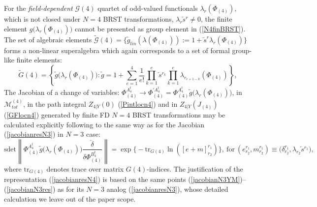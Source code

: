 \documentclass[10pt]{article}
\begin{document}
For the \emph{field-dependent}  $\mathcal{G}(4)$ quartet of odd-valued functionals $\lambda_r({\Phi}_{(4)})$,
which is not closed under $N=4$ BRST transformations, $\lambda_r \overleftarrow{s}{}^r \ne 0$,  the  finite element $g\big(\lambda_r({\Phi}_{(4)})\big)$ cannot be presented as group element  in (\ref{N4finBRST}). The set of algebraic elements
$\widetilde{\mathcal{G}}(4) =\big\{\tilde{g}_{lin}(\lambda ({\Phi}_{(4)})):=1+\overleftarrow{s}^r\lambda_r({\Phi}_{(4)})\big\}$
forms a non-linear superalgebra which again corresponds to a set of formal group-like finite elements:
\begin{equation}
\tilde{G}(4)=\left\{ \tilde{g}\big(\lambda_r({\Phi}_{(4)})\big):\tilde{g}=1+  \sum_{e=1}^4\frac{1}{e!}\prod_{k=1}^e  \overleftarrow{s}{}^{r_k} \prod_{k=1}^e \lambda_{r_{e+1-k}}({\Phi}_{(4)}) \right\} ,
\label{tildeG4}
\end{equation}
The Jacobian of a change of variables:
${\Phi}{}^{A^t_4}_{(4)}\to {\Phi}{}^{\prime A^t_4}_{(4)}=
{\Phi}{}^{A^t_4}_{(4)}\tilde{g}\big(\lambda_r({\Phi}_{(4)})\big)$, in $\mathcal{M}^{(4)}_{tot}$, in the path integral ${Z}_{4|Y}(0)$ (\ref {Pintlocn4}) and in ${Z}_{4|Y}({J}_{(4)})$ (\ref{GFlocn4})
 generated by finite FD  $N=4$ BRST transformations may be calculated
explicitly  following to the same way as for the Jacobian (\ref{jacobianresN3}) in $N=3$ case:
\begin{equation}
\mathrm{sdet}\left\|{\Phi}{}^{A^t_4}_{(4)}\tilde{g}\big(\lambda_r({\Phi}_{(4)})\big)\frac{\overleftarrow{\delta}}{\delta {\Phi}{}^{B^t_4}_{(4)}} \right\| = \exp \Big\{-\mathrm{tr}_{G(4)}\ln \left( [e+m]^{r_1}_{r_2}\right) \Big\}, \ \mathrm{for} \ (e^{r_1}_{r_2}, m^{r_1}_{r_2})\equiv \big(\delta^{r_1}_{r_2}, \lambda_{r_2} \overleftarrow{s}{}^{r_1}\big),
\label{jacobianresN4}
\end{equation}%
where $\mathrm{tr}_{G(4)}$ denotes  trace over matrix $G(4)$-indices. The justification of the representation (\ref{jacobianresN4}) is based on the same points (\ref{jacobianN3YM})--(\ref{jacobianN3res})  as for its $N=3$ analog (\ref{jacobianresN3}), whose detailed calculation we leave out of the paper scope.
\end{document}
